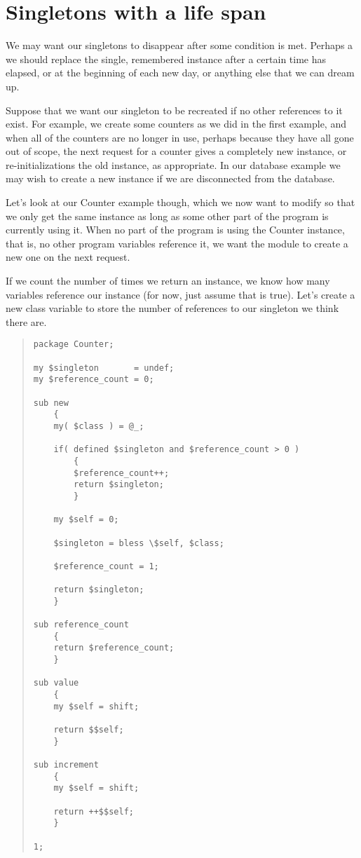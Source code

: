     \section{Singletons with a life span}
    
We may want our singletons to disappear after some condition
is met.  Perhaps a we should replace the single, remembered
instance after a certain time has elapsed, or at the
beginning of each new day, or anything else that we can
dream up.

Suppose that we want our singleton to be recreated if no
other references to it exist.  For example, we create some
counters as we did in the first example, and when all of the
counters are no longer in use, perhaps because they have all
gone out of scope, the next request for a counter gives a
completely new instance, or re-initializations the old
instance, as appropriate.  In our database example we may wish
to create a new instance if we are disconnected from the 
database.

Let's look at our Counter example though, which we now want
to modify so that we only get the same instance as long as 
some other part of the program is currently using it.  When
no part of the program is using the Counter instance, that is,
no other program variables reference it, we want the module
to create a new one on the next request.

If we count the number of times we return an instance, we know
how many variables reference our instance (for now, just assume
that is true).  Let's create a new class
variable to store the number of references to our singleton
we think there are. 

\begin{quote}    
\begin{verbatim}
package Counter;

my $singleton       = undef;
my $reference_count = 0;

sub new
    {
    my( $class ) = @_;

    if( defined $singleton and $reference_count > 0 )
        {
        $reference_count++;
        return $singleton;
        }

    my $self = 0;

    $singleton = bless \$self, $class;

    $reference_count = 1;
    
    return $singleton;
    }
        
sub reference_count
    {
    return $reference_count;
    }
    
sub value
    {
    my $self = shift;

    return $$self;
    }

sub increment
    {
    my $self = shift;

    return ++$$self;
    }

1;
\end{verbatim}
\end{quote}    

